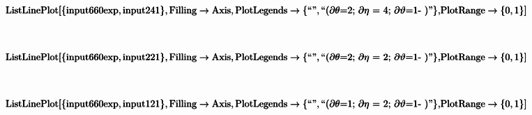 \documentclass{article}
\newcommand{\unicode}[1]{{}}
\begin{document}
\begin{doublespace}
\noindent\(\pmb{\text{ListLinePlot}[\{\text{input660exp}, \text{input241}\},\text{Filling}\to \text{Axis}, \text{PlotLegends}\to \{\text{{``}$\unicode{042d}\unicode{043a}\unicode{0441}\unicode{043f}\unicode{0435}\unicode{0440}\unicode{0438}\unicode{043c}\unicode{0435}\unicode{043d}\unicode{0442}${''}},\text{{``}$\unicode{0422}\unicode{0435}\unicode{043e}\unicode{0440}\unicode{0438}\unicode{044f}$($\partial
\theta $=2; $\partial \eta $ = 4; $\partial \vartheta $=1-$\unicode{0432}\unicode{043d}\unicode{0435}\unicode{0448}\unicode{043d}\unicode{0438}\unicode{0439}$
$\unicode{0446}\unicode{0438}\unicode{043a}\unicode{043b}$){''}}\},}\\
\pmb{\text{PlotRange}\to \{0,1\}]}\)
\end{doublespace}

\begin{doublespace}
\noindent\(\begin{array}{cc}
  &  \\
\end{array}\)
\end{doublespace}

\begin{doublespace}
\noindent\(\pmb{\text{ListLinePlot}[\{\text{input660exp}, \text{input221}\},\text{Filling}\to \text{Axis}, \text{PlotLegends}\to \{\text{{``}$\unicode{042d}\unicode{043a}\unicode{0441}\unicode{043f}\unicode{0435}\unicode{0440}\unicode{0438}\unicode{043c}\unicode{0435}\unicode{043d}\unicode{0442}${''}},\text{{``}$\unicode{0422}\unicode{0435}\unicode{043e}\unicode{0440}\unicode{0438}\unicode{044f}$($\partial
\theta $=2; $\partial \eta $ = 2; $\partial \vartheta $=1-$\unicode{0432}\unicode{043d}\unicode{0435}\unicode{0448}\unicode{043d}\unicode{0438}\unicode{0439}$
$\unicode{0446}\unicode{0438}\unicode{043a}\unicode{043b}$){''}}\},}\\
\pmb{\text{PlotRange}\to \{0,1\}]}\)
\end{doublespace}

\begin{doublespace}
\noindent\(\begin{array}{cc}
  &  \\
\end{array}\)
\end{doublespace}

\begin{doublespace}
\noindent\(\pmb{\text{ListLinePlot}[\{\text{input660exp}, \text{input121}\},\text{Filling}\to \text{Axis}, \text{PlotLegends}\to \{\text{{``}$\unicode{042d}\unicode{043a}\unicode{0441}\unicode{043f}\unicode{0435}\unicode{0440}\unicode{0438}\unicode{043c}\unicode{0435}\unicode{043d}\unicode{0442}${''}},\text{{``}$\unicode{0422}\unicode{0435}\unicode{043e}\unicode{0440}\unicode{0438}\unicode{044f}$($\partial
\theta $=1; $\partial \eta $ = 2; $\partial \vartheta $=1-$\unicode{0432}\unicode{043d}\unicode{0435}\unicode{0448}\unicode{043d}\unicode{0438}\unicode{0439}$
$\unicode{0446}\unicode{0438}\unicode{043a}\unicode{043b}$){''}}\},}\\
\pmb{\text{PlotRange}\to \{0,1\}]}\)
\end{doublespace}
\end{document}
